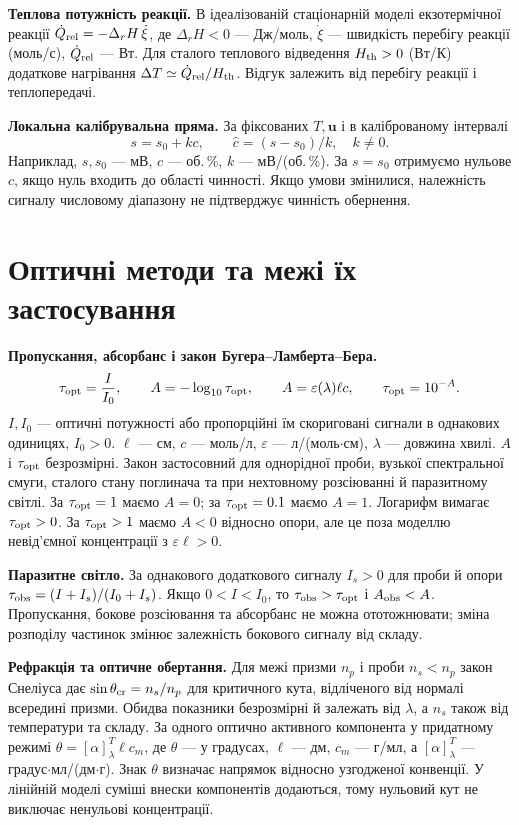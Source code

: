 \documentclass[11pt,a4paper]{article}
\begin{document}
\textbf{Теплова потужність реакції.}
В ідеалізованій стаціонарній моделі екзотермічної реакції $\dot Q_{\rm rel}=-\Delta_r H\,\dot\xi$, де $\Delta_r H<0$ --- Дж/моль, $\dot\xi$ --- швидкість перебігу реакції (моль/с), $\dot Q_{\rm rel}$ --- Вт. Для сталого теплового відведення $H_{\rm th}>0$ (Вт/К) додаткове нагрівання $\Delta T\simeq\dot Q_{\rm rel}/H_{\rm th}$. Відгук залежить від перебігу реакції і теплопередачі.

\textbf{Локальна калібрувальна пряма.}
За фіксованих $T,\mathbf u$ і в каліброваному інтервалі
\[
 s=s_0+kc,\qquad \widehat c=(s-s_0)/k,\quad k\ne0.
\]
Наприклад, $s,s_0$ --- мВ, $c$ --- об.\,\%, $k$ --- мВ/(об.\,\%). За $s=s_0$ отримуємо нульове $c$, якщо нуль входить до області чинності. Якщо умови змінилися, належність сигналу числовому діапазону не підтверджує чинність обернення.

\section{Оптичні методи та межі їх застосування}

\textbf{Пропускання, абсорбанс і закон Бугера--Ламберта--Бера.}
\[
 \tau_{\rm opt}=\frac{I}{I_0},\qquad
 A=-\log_{10}\tau_{\rm opt},\qquad
 A=\varepsilon(\lambda)\ell c,\qquad
 \tau_{\rm opt}=10^{-A}.
\]
$I,I_0$ --- оптичні потужності або пропорційні їм скориговані сигнали в однакових одиницях, $I_0>0$. $\ell$ --- см, $c$ --- моль/л, $\varepsilon$ --- л/(моль$\cdot$см), $\lambda$ --- довжина хвилі. $A$ і $\tau_{\rm opt}$ безрозмірні. Закон застосовний для однорідної проби, вузької спектральної смуги, сталого стану поглинача та при нехтовному розсіюванні й паразитному світлі. За $\tau_{\rm opt}=1$ маємо $A=0$; за $\tau_{\rm opt}=0.1$ маємо $A=1$. Логарифм вимагає $\tau_{\rm opt}>0$. За $\tau_{\rm opt}>1$ маємо $A<0$ відносно опори, але це поза моделлю невід’ємної концентрації з $\varepsilon\ell>0$.

\textbf{Паразитне світло.}
За однакового додаткового сигналу $I_s>0$ для проби й опори
$\tau_{\rm obs}=(I+I_s)/(I_0+I_s)$. Якщо $0<I<I_0$, то $\tau_{\rm obs}>\tau_{\rm opt}$ і $A_{\rm obs}<A$. Пропускання, бокове розсіювання та абсорбанс не можна ототожнювати; зміна розподілу частинок змінює залежність бокового сигналу від складу.

\textbf{Рефракція та оптичне обертання.}
Для межі призми $n_p$ і проби $n_s<n_p$ закон Снеліуса дає
$\sin\theta_{\rm cr}=n_s/n_p$ для критичного кута, відліченого від нормалі всередині призми. Обидва показники безрозмірні й залежать від $\lambda$, а $n_s$ також від температури та складу.
За одного оптично активного компонента у придатному режимі
$\theta=[\alpha]_\lambda^T\ell c_m$, де $\theta$ --- у градусах, $\ell$ --- дм, $c_m$ --- г/мл, а $[\alpha]_\lambda^T$ --- градус$\cdot$мл/(дм$\cdot$г).
Знак $\theta$ визначає напрямок відносно узгодженої конвенції. У лінійній моделі суміші внески компонентів додаються, тому нульовий кут не виключає ненульові концентрації.
\end{document}
